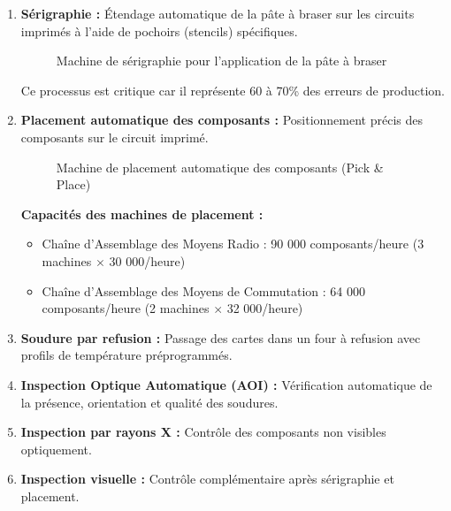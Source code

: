\begin{enumerate}
    \item \textbf{Sérigraphie :} Étendage automatique de la pâte à braser sur les circuits imprimés à l’aide de pochoirs (stencils) spécifiques.
    
    \begin{figure}[H]
        \centering
        \caption{Machine de sérigraphie pour l’application de la pâte à braser}
        \label{fig:serigraphie}
    \end{figure}
    
    Ce processus est critique car il représente 60 à 70\% des erreurs de production.
    
    \item \textbf{Placement automatique des composants :} Positionnement précis des composants sur le circuit imprimé.
    
    \begin{figure}[H]
        \centering
        \caption{Machine de placement automatique des composants (Pick \& Place)}
        \label{fig:pick_place}
    \end{figure}
    
    \textbf{Capacités des machines de placement :}
    \begin{itemize}
        \item Chaîne d'Assemblage des Moyens Radio : 90 000 composants/heure (3 machines $\times$ 30 000/heure)
        \item Chaîne d'Assemblage des Moyens de Commutation : 64 000 composants/heure (2 machines $\times$ 32 000/heure)
    \end{itemize}
    
    \item \textbf{Soudure par refusion :} Passage des cartes dans un four à refusion avec profils de température préprogrammés.
    
    \item \textbf{Inspection Optique Automatique (AOI) :} Vérification automatique de la présence, orientation et qualité des soudures.
    
    \item \textbf{Inspection par rayons X :} Contrôle des composants non visibles optiquement.
    
    \item \textbf{Inspection visuelle :} Contrôle complémentaire après sérigraphie et placement.
\end{enumerate}

